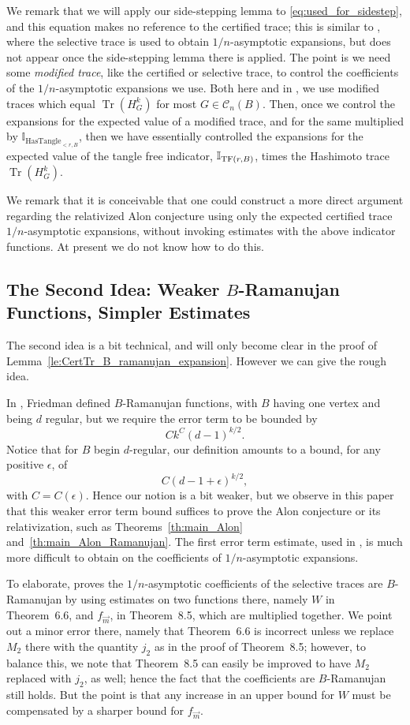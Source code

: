 \documentclass{memo-l}
\newcommand{\TF}{{\rm TF}}
\theoremstyle{plain}
\theoremstyle{definition}
\numberwithin{section}{chapter}
\numberwithin{equation}{chapter}
\DeclareMathOperator{\HasTangle}{HasTangle}
\DeclareMathOperator{\Tr}{Tr}
\theoremstyle{plain}
\theoremstyle{definition}
\newcommand\II{\mathbb{I}}
\newcommand\cC{\mathcal{C}}
\begin{document}
We remark that we will apply our side-stepping lemma to
\eqref{eq:used_for_sidestep}, and this equation
makes no reference to the certified trace;
this is similar to \cite{friedman_alon}, where the selective trace is
used to obtain $1/n$-asymptotic expansions, but does not appear once
the side-stepping lemma there is applied.
The point is we need some {\em modified trace}, 
like the certified or selective
trace, to control the coefficients of the 
$1/n$-asymptotic expansions we use.  
Both here and in \cite{friedman_alon}, we use modified traces which
equal $\Tr(H_G^k)$ for most $G\in\cC_n(B)$.
Then, once we control the expansions
for the expected value of a modified
trace, and for the same multiplied by $\II_{\HasTangle_{<r,B}}$, then we
have essentially controlled the expansions
for the expected value of the
tangle free indicator,
$\II_{\TF(r,B)}$, times the Hashimoto trace $\Tr(H_G^k)$.

We remark that it is conceivable that one could construct a more direct
argument regarding the relativized Alon conjecture using only the
expected certified trace $1/n$-asymptotic expansions, without
invoking estimates with the above indicator functions.  At present we
do not know how to do this.

\subsection{The Second Idea: Weaker $B$-Ramanujan Functions,
Simpler Estimates}

The second idea is a bit technical, and will only become clear in the
proof of Lemma~\ref{le:CertTr_B_ramanujan_expansion}.  However we
can give the rough idea.  

In \cite{friedman_random_graphs,friedman_alon}, Friedman defined
$B$-Ramanujan
functions, with $B$ having one vertex and being $d$ regular, but we
require the error term to be bounded by
$$
C k^C (d-1)^{k/2}.
$$
Notice that for $B$ begin $d$-regular, our definition amounts to a
bound, for any positive $\epsilon$, of
$$
C (d-1+\epsilon)^{k/2},
$$
with $C=C(\epsilon)$.  Hence our notion is a bit weaker, but we observe
in this paper that this weaker error term bound
suffices to prove the Alon conjecture or its relativization, such as
Theorems~\ref{th:main_Alon} 
and~\ref{th:main_Alon_Ramanujan}.
The first error term estimate, used in \cite{friedman_random_graphs,
friedman_alon}, is much more difficult to obtain on the coefficients
of $1/n$-asymptotic expansions.

To elaborate, \cite{friedman_alon} 
proves the $1/n$-asymptotic coefficients of the selective traces
are $B$-Ramanujan by using
estimates on two functions there, namely $W$ in Theorem~6.6, and
$f_{\vec m}$, in Theorem~8.5, which are multiplied together.
We point out a minor error there, namely
that Theorem~6.6 is incorrect unless 
we replace $M_2$ there with the quantity $j_2$ as in the
proof of Theorem~8.5; however, to balance this, we 
note that Theorem~8.5 can easily be improved
to have $M_2$ replaced with $j_2$, as well; hence
the fact that the coefficients
are $B$-Ramanujan still holds.
But the point is that any increase in an upper bound for $W$ must be 
compensated by a sharper bound for $f_{\vec m}$.
\end{document}
